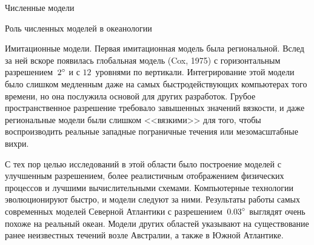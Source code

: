 \begin{chapter}{Численные модели}
\begin{section}{Роль численных моделей в океанологии}
\begin{paragraph}{Имитационные модели.}
Первая имитационная модель была региональной. Вслед за ней вскоре появилась
глобальная модель (Cox, 1975) с горизонтальным разрешением~${2}^\circ$
и с $12$~уровнями по вертикали. Интегрирование этой модели было слишком 
медленным даже на самых быстродействующих компьютерах того времени, 
но она послужила основой для других разработок. Грубое пространственное 
разрешение требовало завышенных значений вязкости, и даже региональные модели 
были слишком <<вязкими>> для того, чтобы воспроизводить реальные 
западные пограничные течения или мезомасштабные 
вихри.
%

С тех пор целью исследований в этой области было построение моделей с 
улучшенным разрешением, более реалистичным отображением физических процессов
и лучшими вычислительными схемами. Компьютерные технологии эволюционируют 
быстро, и модели следуют за ними. Результаты работы самых современных моделей
Северной Атлантики с разрешением~${0.03}^\circ$ выглядят очень похоже на
реальный океан. Модели других областей указывают на существование ранее
неизвестных течений возле Австралии, а также в Южной Атлантике.
%
\end{paragraph}


\end{section}
\end{chapter}
